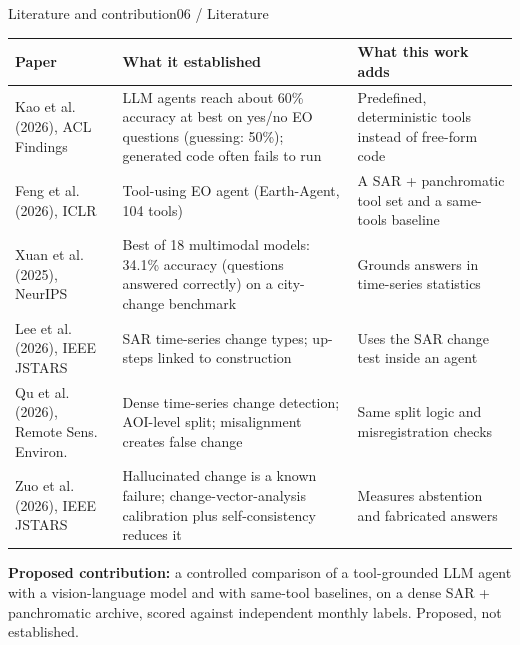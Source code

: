 \documentclass[aspectratio=169,11pt]{beamer}
\begin{document}
\begin{frame}[shrink=22]{Literature and contribution}{06 / Literature}
\footnotesize
\begin{tabularx}{\textwidth}{@{}p{3.6cm}YY@{}}
\toprule
\textbf{Paper} & \textbf{What it established} & \textbf{What this work adds} \\
\midrule
Kao et al. (2026), ACL Findings & LLM agents reach about 60\% accuracy at best on yes/no EO questions (guessing: 50\%); generated code often fails to run & Predefined, deterministic tools instead of free-form code \\
Feng et al. (2026), ICLR & Tool-using EO agent (Earth-Agent, 104 tools) & A SAR + panchromatic tool set and a same-tools baseline \\
Xuan et al. (2025), NeurIPS & Best of 18 multimodal models: 34.1\% accuracy (questions answered correctly) on a city-change benchmark & Grounds answers in time-series statistics \\
Lee et al. (2026), IEEE JSTARS & SAR time-series change types; up-steps linked to construction & Uses the SAR change test inside an agent \\
Qu et al. (2026), Remote Sens. Environ. & Dense time-series change detection; AOI-level split; misalignment creates false change & Same split logic and misregistration checks \\
Zuo et al. (2026), IEEE JSTARS & Hallucinated change is a known failure; change-vector-analysis calibration plus self-consistency reduces it & Measures abstention and fabricated answers \\
\bottomrule
\end{tabularx}
\vspace{3pt}
{\footnotesize\textbf{Proposed contribution:} a controlled comparison of a tool-grounded LLM agent with a vision-language model and with same-tool baselines, on a dense SAR + panchromatic archive, scored against independent monthly labels. \alert{Proposed, not established.}}
\end{frame}
\end{document}
